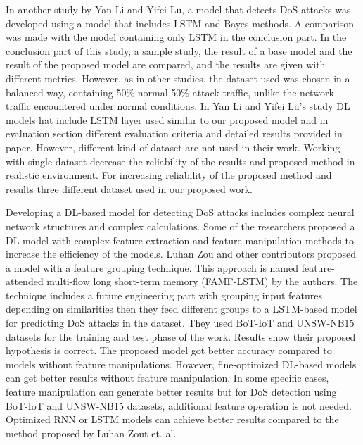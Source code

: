 \documentclass{article}
\begin{document}
In another study by Yan Li and Yifei Lu, a model that detects DoS attacks was developed using a model that includes LSTM and Bayes methods. A comparison was made with the model containing only LSTM in the conclusion part\cite{Li}. In the conclusion part of this study, a sample study, the result of a base model and the result of the proposed model are compared, and the results are given with different metrics. However, as in other studies, the dataset used was chosen in a balanced way, containing 50\% normal 50\% attack traffic, unlike the network traffic encountered under normal conditions. In Yan Li and Yifei Lu's study DL models hat include LSTM layer used similar to our proposed model and in evaluation section different evaluation criteria and detailed results provided in paper. However, different kind of dataset are not used in their work. Working with single dataset decrease the reliability of the results and proposed method in realistic environment. For increasing reliability of the proposed method and results three different dataset used in our proposed work.

Developing a DL-based model for detecting DoS attacks includes complex neural network structures and complex calculations. Some of the researchers proposed a DL model with complex feature extraction and feature manipulation methods to increase the efficiency of the models. Luhan Zou and other contributors proposed a model with a feature grouping technique\cite{LuhanZou}. This approach is named feature-attended multi-flow long short-term memory (FAMF-LSTM) by the authors. The technique includes a future engineering part with grouping input features depending on similarities then they feed different groups to a LSTM-based model for predicting DoS attacks in the dataset. They used BoT-IoT and UNSW-NB15 datasets for the training and test phase of the work.
Results show their proposed hypothesis is correct. The proposed model got better accuracy compared to models without feature manipulations. However, fine-optimized DL-based models can get better results without feature manipulation. In some specific cases, feature manipulation can generate better results but for DoS detection using BoT-IoT and UNSW-NB15 datasets, additional feature operation is not needed. Optimized RNN or LSTM models can achieve better results compared to the method proposed by Luhan Zout et. al.
\end{document}
